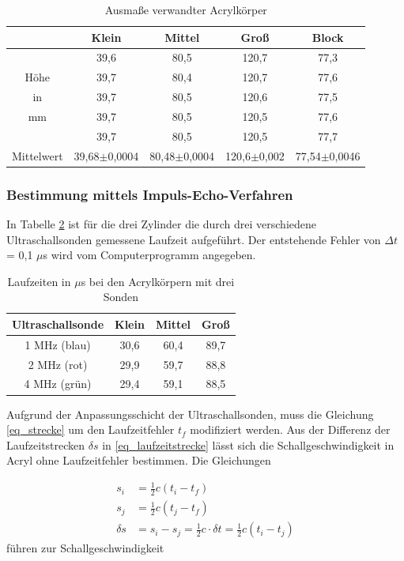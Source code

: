 \begin{table}[H]
 \begin{tabular}{c|c|c|c|c}
  & Klein & Mittel & Groß & Block\\
  \hline
	&39,6&	80,5&	120,7&	77,3\\
Höhe 	&39,7&	80,4&	120,7&	77,6\\
in 	&39,7&	80,5&	120,6&	77,5\\
mm 	&39,7&	80,5&	120,5&	77,6\\
	&39,7&	80,5&	120,5&	77,7\\
	\hline
Mittelwert	&39,68$\pm$0,0004&	80,48$\pm$0,0004 &	120,6$\pm$0,002&	77,54$\pm$0,0046
 \end{tabular}
 \caption{Ausmaße verwandter Acrylkörper}
\label{tab_masse}
\end{table}

\subsubsection{Bestimmung mittels Impuls-Echo-Verfahren}
\label{sec_impulsecho}
In Tabelle \ref{tab_impulsecho} ist für die drei Zylinder die durch drei verschiedene Ultraschallsonden gemessene Laufzeit aufgeführt. Der
entstehende Fehler von $\Delta t$ = 0,1 $\mu$s wird vom Computerprogramm angegeben.

\begin{table}[H]
 \begin{tabular}{c|c|c|c}
 Ultraschallsonde & Klein & Mittel & Groß\\
 \hline
1 MHz (blau)&	30,6&	60,4&	89,7\\
2 MHz (rot)&	29,9&	59,7&	88,8\\
4 MHz (grün)&	29,4&	59,1&	88,5\\  
 \end{tabular}
\caption{Laufzeiten in $\mu$s bei den Acrylkörpern mit drei Sonden}
\label{tab_impulsecho}
\end{table}

Aufgrund der Anpassungsschicht der Ultraschallsonden, muss die Gleichung \eqref{eq_strecke} um den Laufzeitfehler $t_f$ modifiziert werden.
Aus der Differenz der Laufzeitstrecken $\delta s$ in \eqref{eq_laufzeitstrecke} lässt sich die Schallgeschwindigkeit in Acryl ohne 
Laufzeitfehler bestimmen. Die Gleichungen

\begin{align}
\label{eq_laufzeitfehler}
 s_i &= \frac12 c (t_i - t_f)\\
 \nonumber
 s_j &= \frac12 c (t_j - t_f)\\
 \delta s &= s_i - s_j = \frac12 c \cdot  \delta t = \frac12 c (t_i - t_j)
 \label{eq_laufzeitstrecke}
\end{align}
führen zur Schallgeschwindigkeit


